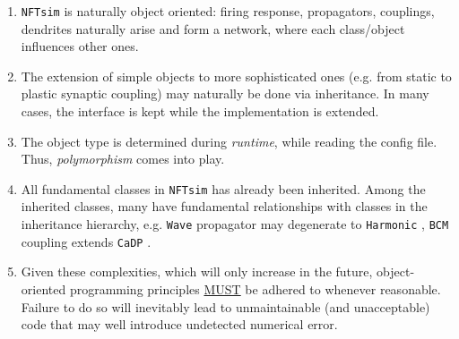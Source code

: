 \documentclass[12pt,a4paper]{article}
\newcommand{\type}[1]{{\small\small\tt #1} }
\newcommand{\NF}[0]{\type{NFTsim}}
\begin{document}
\begin{enumerate}
    \item \NF is naturally object oriented: firing response, propagators, couplings, dendrites naturally arise and form a network, where each class/object influences other ones.
    \item The extension of simple objects to more sophisticated ones (e.g. from static to plastic synaptic coupling) may naturally be done via inheritance. In many cases, the interface is kept while the implementation is extended.
    \item The object type is determined during \emph{runtime}, while reading the config file. Thus, \emph{polymorphism} comes into play.
    \item All fundamental classes in \NF has already been inherited. Among the inherited classes, many have fundamental relationships with classes in the inheritance hierarchy, e.g. \type{Wave} propagator may degenerate to \type{Harmonic}, \type{BCM} coupling extends \type{CaDP}.
    \item Given these complexities, which will only increase in the future, object-oriented programming principles \underline{MUST} be adhered to whenever reasonable. Failure to do so will inevitably lead to unmaintainable (and unacceptable) code that may well introduce undetected numerical error.
\end{enumerate}
\end{document}
